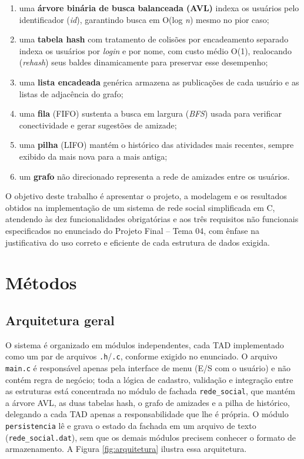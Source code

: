 \documentclass[
	12pt,				%
	oneside,			%
	a4paper,			%
	chapter=TITLE,		%
	brazil,				%
	]{abntex2}
\begin{document}
\begin{enumerate}
	\item uma \textbf{árvore binária de busca balanceada (AVL)} indexa os
	usuários pelo identificador (\emph{id}), garantindo busca em O(log
	\emph{n}) mesmo no pior caso;
	\item uma \textbf{tabela hash} com tratamento de colisões por
	encadeamento separado indexa os usuários por \emph{login} e por nome,
	com custo médio O(1), realocando (\emph{rehash}) seus baldes
	dinamicamente para preservar esse desempenho;
	\item uma \textbf{lista encadeada} genérica armazena as publicações de
	cada usuário e as listas de adjacência do grafo;
	\item uma \textbf{fila} (FIFO) sustenta a busca em largura (\emph{BFS})
	usada para verificar conectividade e gerar sugestões de amizade;
	\item uma \textbf{pilha} (LIFO) mantém o histórico das atividades mais
	recentes, sempre exibido da mais nova para a mais antiga;
	\item um \textbf{grafo} não direcionado representa a rede de amizades
	entre os usuários.
\end{enumerate}

O objetivo deste trabalho é apresentar o projeto, a modelagem e os
resultados obtidos na implementação de um sistema de rede social
simplificada em C, atendendo às dez funcionalidades obrigatórias e aos três
requisitos não funcionais especificados no enunciado do Projeto Final --
Tema 04, com ênfase na justificativa do uso correto e eficiente de cada
estrutura de dados exigida.

\chapter{Métodos}

\section{Arquitetura geral}

O sistema é organizado em módulos independentes, cada TAD implementado como
um par de arquivos \texttt{.h}/\texttt{.c}, conforme exigido no enunciado. O
arquivo \texttt{main.c} é responsável apenas pela interface de menu (E/S
com o usuário) e não contém regra de negócio; toda a lógica de cadastro,
validação e integração entre as estruturas está concentrada no módulo de
fachada \texttt{rede\_social}, que mantém a árvore AVL, as duas tabelas
hash, o grafo de amizades e a pilha de histórico, delegando a cada TAD
apenas a responsabilidade que lhe é própria. O módulo \texttt{persistencia}
lê e grava o estado da fachada em um arquivo de texto
(\texttt{rede\_social.dat}), sem que os demais módulos precisem conhecer o
formato de armazenamento. A Figura \ref{fig:arquitetura} ilustra essa
arquitetura.
\end{document}
